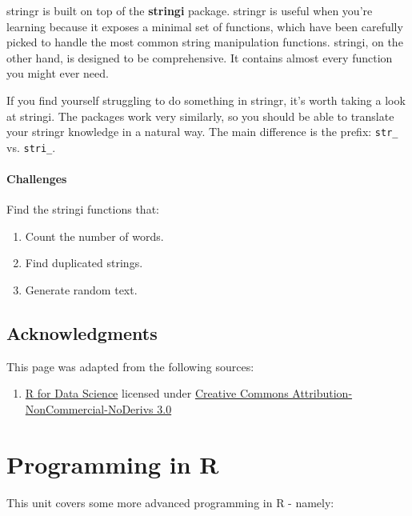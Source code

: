 \documentclass[]{book}
\providecommand{\tightlist}{%
  \setlength{\itemsep}{0pt}\setlength{\parskip}{0pt}}
\begin{document}
stringr is built on top of the \textbf{stringi} package. stringr is
useful when you're learning because it exposes a minimal set of
functions, which have been carefully picked to handle the most common
string manipulation functions. stringi, on the other hand, is designed
to be comprehensive. It contains almost every function you might ever
need.

If you find yourself struggling to do something in stringr, it's worth
taking a look at stringi. The packages work very similarly, so you
should be able to translate your stringr knowledge in a natural way. The
main difference is the prefix: \texttt{str\_} vs. \texttt{stri\_}.

\subsubsection*{Challenges}\label{challenges-20}

Find the stringi functions that:

\begin{enumerate}
\def\labelenumi{\arabic{enumi}.}
\item
  Count the number of words.
\item
  Find duplicated strings.
\item
  Generate random text.
\end{enumerate}

\section*{Acknowledgments}\label{acknowledgments-5}

This page was adapted from the following sources:

\begin{enumerate}
\def\labelenumi{\arabic{enumi}.}
\tightlist
\item
  \href{https://r4ds.had.co.nz}{R for Data Science} licensed under
  \href{https://creativecommons.org/licenses/by-nc-nd/3.0/us/}{Creative
  Commons Attribution-NonCommercial-NoDerivs 3.0}
\end{enumerate}

\chapter{Programming in R}\label{programming-in-r}

This unit covers some more advanced programming in R - namely:
\end{document}
